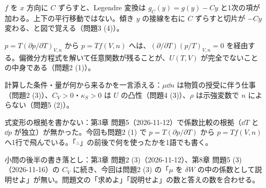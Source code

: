 \documentclass[uplatex,dvipdfmx,a4paper,11pt]{jsarticle}
\begin{document}
\matome
\begin{saitenichiran}
\end{saitenichiran}
\begin{daiji}
  \item $f$ を $x$ 方向に $C$ ずらすと、Legendre 変換は $g_{C}(y)=g(y)-Cy$ と1次の項が加わる。上下の平行移動ではない。傾き $y$ の接線を右に $C$ ずらすと切片が $-Cy$ 変わる、と図で覚える（問題3 (4)）。
  \item $p=T(\partial p/\partial T)_{V,n}$ から $p=Tf(V,n)$ へは、$(\partial/\partial T)(p/T)_{V,n}=0$ を経由する。偏微分方程式を解いて任意関数が残ることが、$U(T,V)$ が完全でないことの中身である（問題2 (1)）。
  \item 計算した条件・量が何から来るかを一言添える：$\mu\dd n$ は物質の授受に伴う仕事（問題2 (3)）、$C_{V}>0$・$\kappa_{S}>0$ は $U$ の凸性（問題4 (3)）、$\rho$ は示強変数で $n$ によらない（問題5 (2)）。
\end{daiji}
\begin{maemo}
  \item 式変形の根拠を書かない：第3章 問題5（2026-11-12）で係数比較の根拠（$\dd T$ と $\dd p$ が独立）が無かった。今回も問題2 (1) で $p=T(\partial p/\partial T)$ から $p=Tf(V,n)$ へ1行で飛んでいる。「$\therefore$」の前後で何を使ったかを1語でも書く。
  \item 小問の後半の書き落とし：第3章 問題2 (3)（2026-11-12）、第8章 問題5 (3)（2026-11-16）の $C_{V}$ に続き、今回は問題2 (3) の「$\mu$ を $\delta W$ の中の係数として説明せよ」が無い。問題文の「求めよ」「説明せよ」の数と答えの数を合わせる。
\end{maemo}
\end{document}
